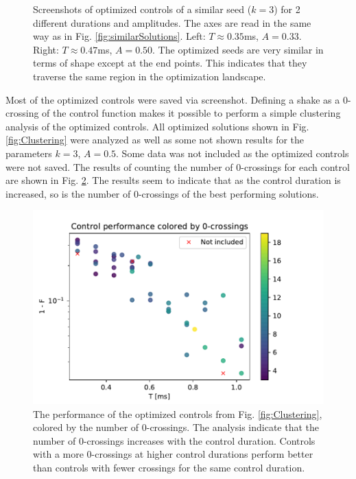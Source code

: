 \documentclass[a4paper, twocolumn]{revtex4-1}
\begin{document}
\begin{figure}
\begin{subfigure}{0.4\columnwidth}
	\end{subfigure}
	\caption{Screenshots of optimized controls of a similar seed ($k=3$) for 2 different durations and amplitudes. The axes are read in the same way as in Fig. \ref{fig:similarSolutions}. Left: $T\approx 0.35$ms, $A=0.33$. Right: $T\approx 0.47$ms, $A=0.50$. The optimized seeds are very similar in terms of shape except at the end points. This indicates that they traverse the same region in the optimization landscape.}
	\label{fig:SimilarTimescales}
\end{figure}

Most of the optimized controls were saved via screenshot. 
Defining a shake as a 0-crossing of the control function makes it possible to perform a simple clustering analysis of the optimized controls. All optimized solutions shown in Fig. \ref{fig:Clustering} were analyzed as well as some not shown results for the parameters $k=3$, $A=0.5$. Some data was not included as the optimized controls were not saved. The results of counting the number of 0-crossings for each control are shown in Fig. \ref{fig:crossingsClustering}. The results seem to indicate that as the control duration is increased, so is the number of 0-crossings of the best performing solutions. 

\begin{figure}
	\includegraphics[width=\columnwidth]{graphics/clustering/crossings.pdf}
	\caption{The performance of the optimized controls from Fig. \ref{fig:Clustering}, colored by the number of 0-crossings. The analysis indicate that the number of 0-crossings increases with the control duration. Controls with a more 0-crossings at higher control durations perform better than controls with fewer crossings for the same control duration.}
	\label{fig:crossingsClustering}
\end{figure}
\end{document}
